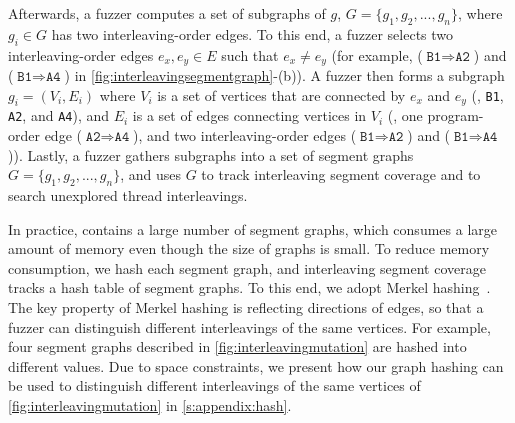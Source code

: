 Afterwards, a fuzzer computes a set of subgraphs of $g$,
$G = \{g_1, g_2, ..., g_n\}$, where $g_i \in G$ has two
interleaving-order edges.
%
%
To this end, a fuzzer selects two interleaving-order edges
$e_x, e_y \in E$ such that $e_x \neq e_y$ (for example,
($\texttt{B1} \Rightarrow \texttt{A2}$) and
($\texttt{B1} \Rightarrow \texttt{A4}$) in
\autoref{fig:interleavingsegmentgraph}-(b)).
%
A fuzzer then forms a subgraph $g_i = (V_i, E_i)$ where $V_i$ is a set
of vertices that are connected by $e_x$ and $e_y$ (\ie, \texttt{B1},
\texttt{A2}, and \texttt{A4}), and $E_i$ is a set of edges connecting
vertices in $V_i$ (\ie, one program-order edge
($\texttt{A2} \Rightarrow \texttt{A4}$), and two interleaving-order
edges ($\texttt{B1} \Rightarrow \texttt{A2}$) and
($\texttt{B1} \Rightarrow \texttt{A4}$)).
%
Lastly, a fuzzer gathers subgraphs into a set of segment graphs
$G = \{g_1, g_2, ..., g_n\}$, and uses $G$ to track interleaving
segment coverage and to search unexplored thread interleavings.





%
In practice, \intcov contains a large number of segment graphs,
which consumes a large amount of memory even though the size of graphs
is small.
%
To reduce memory consumption, we hash each segment graph, and
interleaving segment coverage tracks a hash table of segment graphs.
%
To this end, we adopt Merkel hashing~\cite{treehashing, treehashing2}.
%
The key property of Merkel hashing is reflecting directions of edges,
so that a fuzzer can distinguish different interleavings of the same
vertices. For example, four segment graphs described in
\autoref{fig:interleavingmutation} are hashed into different values.
%
Due to space constraints, we present how our graph hashing can be used
to distinguish different interleavings of the same vertices of
\autoref{fig:interleavingmutation} in \autoref{s:appendix:hash}.









